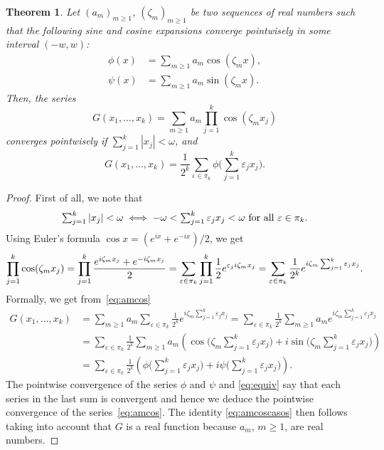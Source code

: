 \documentclass[12pt,leqno]{amsart}
\numberwithin{equation}{section}
\theoremstyle{plain}
\newtheorem{theorem}{Theorem}[section]
\newcommand{\eps}{\varepsilon}
\begin{document}
\begin{theorem}
\label{th:amcos}
Let $(a_m)_{m\ge 1}$, $(\zeta_m)_{m\ge 1}$ be two sequences of real numbers such that the following sine and cosine expansions converge pointwisely in some interval $(-w,w)$:
\begin{align*}
\phi (x) &= \sum_{m\ge 1}a_m\cos (\zeta_m x),\\
\psi (x) &= \sum_{m\ge 1}a_m\sin (\zeta_m x).
\end{align*}
Then, the series
\begin{equation}
\label{eq:amcos}
G(x_1,\dots, x_k) = \sum_{m\ge 1} a_m \prod_{j=1}^k \cos (\zeta_m x_j)
\end{equation}
converges pointwisely if $ \sum_{j=1}^k |x_j| < \omega$, and
\begin{equation}
\label{eq:amcoscasos}
G(x_1,\dots, x_k) =
\frac{1}{2^k} \sum_{\eps \in \pi_k}
\phi \Big( \sum_{j=1}^k\eps_jx_j\Big).
\end{equation}
\end{theorem}

\begin{proof}
First of all, we note that
\begin{equation}
\label{eq:equiv}
\mbox{$ \sum_{j=1}^k |x_j| <\omega \iff -\omega< \sum_{j=1}^k\eps_jx_j<\omega$ for all $\eps\in \pi_k$.}
\end{equation}
Using Euler's formula $\cos x = (e^{ix}+e^{-ix})/2$, we get
\begin{equation*}
\prod_{j=1}^k\cos (\zeta_m x_j)
= \prod_{j=1}^k \frac{e^{i\zeta_m x_j}+e^{-i\zeta_m x_j}}{2}
= \sum_{\eps\in \pi_k} \prod_{j=1}^k \frac{1}{2}e^{\eps_j i\zeta_m x_j} \\
= \sum_{\eps\in \pi_k} \frac{1}{2^k} e^{i\zeta_m \sum_{j=1}^k\eps_j x_j}.
\end{equation*}
Formally, we get from~\eqref{eq:amcos}
\begin{align*}
G(x_1,\dots, x_k)
 &= \sum_{m\ge 1} a_m \sum_{\eps\in \pi_k}
\frac{1}{2^k} e^{i\zeta_m \sum_{j=1}^k\eps_jx_j}
= \sum_{\eps\in \pi_k}
\frac{1}{2^k} \sum_{m\ge 1} a_m e^{i\zeta_m \sum_{j=1}^k\eps_jx_j} \\
 &= \sum_{\eps\in \pi_k} \frac{1}{2^k}
\sum_{m\ge 1} a_m \left( \cos\Big(\zeta_m \sum_{j=1}^k\eps_jx_j\Big)
+ i\sin\Big(\zeta_m \sum_{j=1}^k\eps_jx_j\Big) \right) \\
 &= \sum_{\eps\in \pi_k} \frac{1}{2^k}
\left( \phi\Big( \sum_{j=1}^k\eps_jx_j\Big)
+ i\psi\Big( \sum_{j=1}^k\eps_jx_j\Big) \right).
\end{align*}
The pointwise convergence of the series $\phi$ and $\psi$ and \eqref{eq:equiv} say that each series in the last sum is convergent and hence we deduce the pointwise convergence of the series~\eqref{eq:amcos}. The identity \eqref{eq:amcoscasos} then follows taking into account that $G$ is a real function because $a_m$, $m\ge 1$, are real numbers.
\end{proof}
\end{document}
